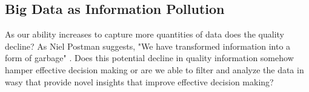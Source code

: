 \subsection{Big Data as Information Pollution}

As our ability increases to capture more quantities of data does the quality decline? As Niel Postman suggests, "We have transformed information into a form of garbage" \cite[cited in][p. 50]{stepp_1999}. Does this potential decline in quality information somehow hamper effective decision making or are we able to filter and analyze the data in wasy that provide novel insights that improve effective decision making?


